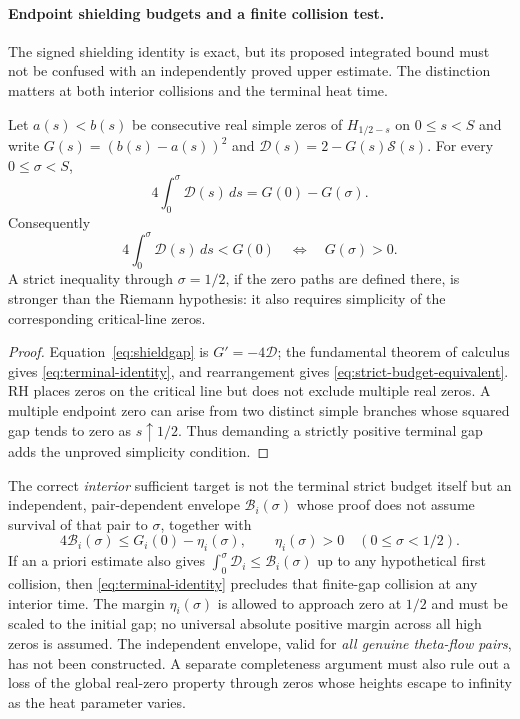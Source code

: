 \paragraph{Endpoint shielding budgets and a finite collision test.}
\label{par:terminal-budget-audit}
The signed shielding identity is exact, but its proposed
integrated bound must not be confused with an independently
proved upper estimate. The distinction matters at both
interior collisions and the terminal heat time.

\begin{proposition}
\label{prop:budget-is-gap}
Let $a(s)<b(s)$ be consecutive real simple zeros of
$H_{1/2-s}$ on $0\le s<S$ and write
$G(s)=(b(s)-a(s))^2$ and
$\mathcal D(s)=2-G(s)\mathcal S(s)$.
For every $0\le\sigma<S$,
\begin{equation}
4\int_0^\sigma\mathcal D(s)\,ds
=G(0)-G(\sigma).
\label{eq:terminal-identity}
\end{equation}
Consequently
\begin{equation}
4\int_0^\sigma\mathcal D(s)\,ds<G(0)
\quad\Longleftrightarrow\quad G(\sigma)>0.
\label{eq:strict-budget-equivalent}
\end{equation}
A strict inequality through $\sigma=1/2$, if the
zero paths are defined there, is stronger than the
Riemann hypothesis: it also requires simplicity of
the corresponding critical-line zeros.
\end{proposition}
\begin{proof}
Equation~\eqref{eq:shieldgap} is $G'=-4\mathcal D$;
the fundamental theorem of calculus gives
\eqref{eq:terminal-identity}, and rearrangement gives
\eqref{eq:strict-budget-equivalent}.
RH places zeros on the critical line but does not
exclude multiple real zeros. A multiple endpoint
zero can arise from two distinct simple branches
whose squared gap tends to zero as $s\uparrow1/2$.
Thus demanding a strictly positive terminal gap
adds the unproved simplicity condition.
\end{proof}

The correct \emph{interior} sufficient target is
not the terminal strict budget itself but an
independent, pair-dependent envelope
$\mathcal B_i(\sigma)$ whose proof does not assume
survival of that pair to $\sigma$, together with
\begin{equation}
\boxed{
4\mathcal B_i(\sigma)\le
G_i(0)-\eta_i(\sigma),\qquad
\eta_i(\sigma)>0\quad
(0\le\sigma<1/2).
}
\label{eq:noncircular-shielding}
\end{equation}
If an a priori estimate also gives
$\int_0^\sigma\mathcal D_i\le\mathcal B_i(\sigma)$
up to any hypothetical first collision, then
\eqref{eq:terminal-identity} precludes that
finite-gap collision at any interior time.
The margin $\eta_i(\sigma)$ is allowed to
approach zero at $1/2$ and must be scaled
to the initial gap; no universal absolute
positive margin across all high zeros is
assumed. The independent envelope,
valid for \emph{all genuine theta-flow pairs},
has not been constructed. A separate
completeness argument must also rule out
a loss of the global real-zero property
through zeros whose heights escape to
infinity as the heat parameter varies.

